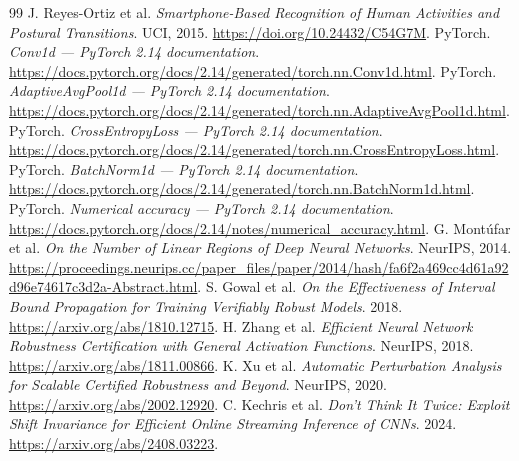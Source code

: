 \documentclass[11pt,a4paper]{article}
\begin{document}
\begin{thebibliography}{99}
 J. Reyes-Ortiz et al. \emph{Smartphone-Based Recognition of Human Activities and Postural Transitions}. UCI, 2015. \url{https://doi.org/10.24432/C54G7M}.
 PyTorch. \emph{Conv1d --- PyTorch 2.14 documentation}. \url{https://docs.pytorch.org/docs/2.14/generated/torch.nn.Conv1d.html}.
 PyTorch. \emph{AdaptiveAvgPool1d --- PyTorch 2.14 documentation}. \url{https://docs.pytorch.org/docs/2.14/generated/torch.nn.AdaptiveAvgPool1d.html}.
 PyTorch. \emph{CrossEntropyLoss --- PyTorch 2.14 documentation}. \url{https://docs.pytorch.org/docs/2.14/generated/torch.nn.CrossEntropyLoss.html}.
 PyTorch. \emph{BatchNorm1d --- PyTorch 2.14 documentation}. \url{https://docs.pytorch.org/docs/2.14/generated/torch.nn.BatchNorm1d.html}.
 PyTorch. \emph{Numerical accuracy --- PyTorch 2.14 documentation}. \url{https://docs.pytorch.org/docs/2.14/notes/numerical_accuracy.html}.
 G. Mont\'ufar et al. \emph{On the Number of Linear Regions of Deep Neural Networks}. NeurIPS, 2014. \url{https://proceedings.neurips.cc/paper_files/paper/2014/hash/fa6f2a469cc4d61a92d96e74617c3d2a-Abstract.html}.
 S. Gowal et al. \emph{On the Effectiveness of Interval Bound Propagation for Training Verifiably Robust Models}. 2018. \url{https://arxiv.org/abs/1810.12715}.
 H. Zhang et al. \emph{Efficient Neural Network Robustness Certification with General Activation Functions}. NeurIPS, 2018. \url{https://arxiv.org/abs/1811.00866}.
 K. Xu et al. \emph{Automatic Perturbation Analysis for Scalable Certified Robustness and Beyond}. NeurIPS, 2020. \url{https://arxiv.org/abs/2002.12920}.
 C. Kechris et al. \emph{Don't Think It Twice: Exploit Shift Invariance for Efficient Online Streaming Inference of CNNs}. 2024. \url{https://arxiv.org/abs/2408.03223}.
\end{thebibliography}
\end{document}
